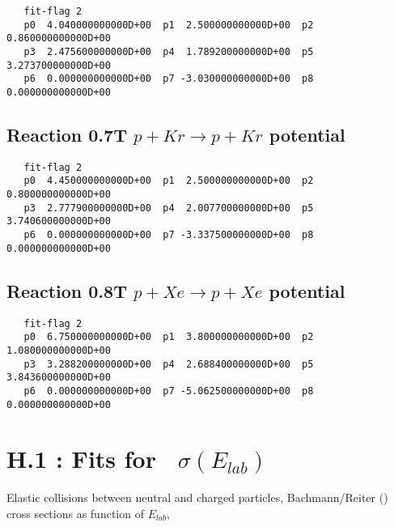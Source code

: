 \documentclass[12pt]{article}
\begin{document}
\begin{small}\begin{verbatim}
   fit-flag 2
   p0  4.040000000000D+00  p1  2.500000000000D+00  p2  0.860000000000D+00
   p3  2.475600000000D+00  p4  1.789200000000D+00  p5  3.273700000000D+00
   p6  0.000000000000D+00  p7 -3.030000000000D+00  p8  0.000000000000D+00
\end{verbatim}\end{small}


\newpage

\subsection{
Reaction 0.7T   $ p + Kr \rightarrow p + Kr $ potential }

\begin{small}\begin{verbatim}
   fit-flag 2
   p0  4.450000000000D+00  p1  2.500000000000D+00  p2  0.800000000000D+00
   p3  2.777900000000D+00  p4  2.007700000000D+00  p5  3.740600000000D+00
   p6  0.000000000000D+00  p7 -3.337500000000D+00  p8  0.000000000000D+00
\end{verbatim}\end{small}


\newpage

\subsection{
Reaction 0.8T   $ p + Xe \rightarrow p + Xe $ potential }

\begin{small}\begin{verbatim}
   fit-flag 2
   p0  6.750000000000D+00  p1  3.800000000000D+00  p2  1.080000000000D+00
   p3  3.288200000000D+00  p4  2.688400000000D+00  p5  3.843600000000D+00
   p6  0.000000000000D+00  p7 -5.062500000000D+00  p8  0.000000000000D+00
\end{verbatim}\end{small}


\newpage

\section{H.1 :  Fits for  \    $\sigma(E_{lab})$}\label{sect1}

\bigskip
Elastic collisions between neutral and charged particles,
Bachmann/Reiter (\cite{kn:Bachmann})
cross sections as function of $E_{lab}$,
\end{document}
